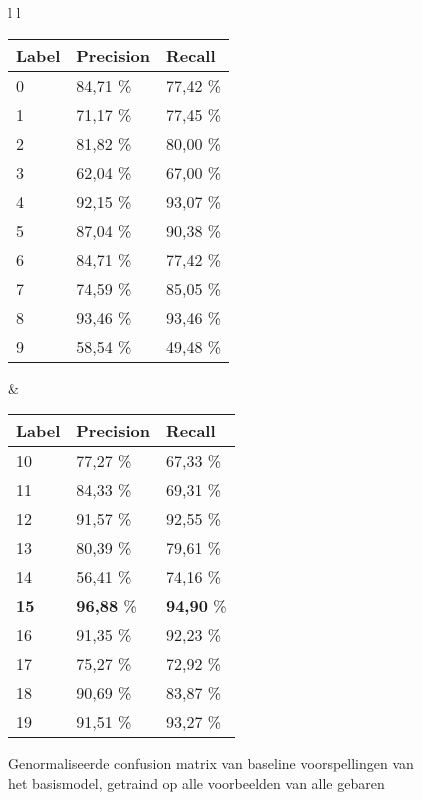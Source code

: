 \begin{figure}
	\centering
	\def\svgwidth{0.9\columnwidth}
	
	\caption{Genormaliseerde confusion matrix van baseline voorspellingen van het basismodel, getraind op alle voorbeelden van alle gebaren }
	\label{fig:conf-allegebaren}
	
	\vspace{1cm}
	\begin{tabular}{l l}
		\begin{tabular}{l l l}
			\hline
			\textbf{Label} & \textbf{Precision} &
			\textbf{Recall}\\
			\hline
			0 & 84,71 \% & 77,42 \% \\
			1 & 71,17 \% & 77,45 \% \\
			2 & 81,82 \% & 80,00 \% \\
			3 & 62,04 \% & 67,00 \% \\
			4 & 92,15 \% & 93,07 \% \\
			5 & 87,04 \% & 90,38 \% \\
			6 & 84,71 \% & 77,42 \% \\
			7 & 74,59 \% & 85,05 \% \\
			8 & 93,46 \% & 93,46 \% \\
			9 & 58,54 \% & 49,48 \% \\
			\hline
		\end{tabular} & 
		\begin{tabular}{l l l}
			\hline
			\textbf{Label} & \textbf{Precision} &
			\textbf{Recall}\\
			\hline
			10 & 77,27 \% & 67,33 \% \\
			11 & 84,33 \% & 69,31 \% \\
			12 & 91,57 \% & 92,55 \% \\
			13 & 80,39 \% & 79,61 \% \\
			14 & 56,41 \% & 74,16 \% \\
			\textbf{15} & \textbf{96,88} \% & \textbf{94,90} \% \\
			16 & 91,35 \% & 92,23 \% \\
			17 & 75,27 \% & 72,92 \% \\
			18 & 90,69 \% & 83,87 \% \\
			19 & 91,51 \% & 93,27 \% \\
			\hline
		\end{tabular}	
	\end{tabular}
	\label{tab:pr-alle-klassen}
\end{figure}


